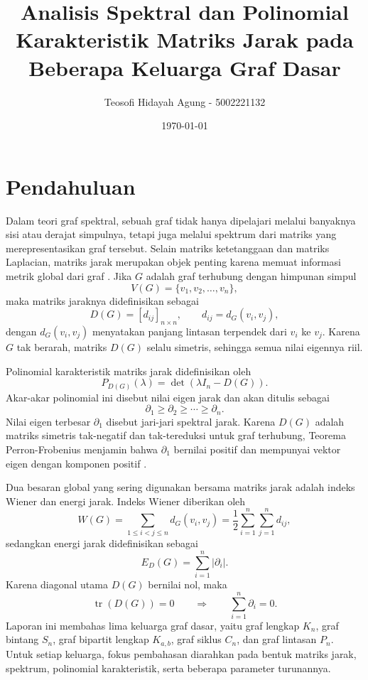 \documentclass[12pt,a4paper]{article}
\title{Analisis Spektral dan Polinomial Karakteristik Matriks Jarak pada Beberapa Keluarga Graf Dasar}
\author{Teosofi Hidayah Agung - 5002221132}
\date{\today}
\begin{document}
\maketitle

\section{Pendahuluan}

Dalam teori graf spektral, sebuah graf tidak hanya dipelajari melalui banyaknya sisi atau derajat simpulnya, tetapi juga melalui spektrum dari matriks yang merepresentasikan graf tersebut. Selain matriks ketetanggaan dan matriks Laplacian, matriks jarak merupakan objek penting karena memuat informasi metrik global dari graf \cite{aouchiche2014distance, stevanovic2012spectral}. Jika $G$ adalah graf terhubung dengan himpunan simpul
\[
  V(G)=\{v_1,v_2,\dots,v_n\},
\]
maka matriks jaraknya didefinisikan sebagai
\[
  D(G)=[d_{ij}]_{n\times n},
  \qquad
  d_{ij}=d_G(v_i,v_j),
\]
dengan $d_G(v_i,v_j)$ menyatakan panjang lintasan terpendek dari $v_i$ ke $v_j$. Karena $G$ tak berarah, matriks $D(G)$ selalu simetris, sehingga semua nilai eigennya riil.

Polinomial karakteristik matriks jarak didefinisikan oleh
\[
  P_{D(G)}(\lambda)=\det(\lambda I_n-D(G)).
\]
Akar-akar polinomial ini disebut nilai eigen jarak dan akan ditulis sebagai
\[
  \partial_1 \ge \partial_2 \ge \cdots \ge \partial_n.
\]
Nilai eigen terbesar $\partial_1$ disebut jari-jari spektral jarak. Karena $D(G)$ adalah matriks simetris tak-negatif dan tak-tereduksi untuk graf terhubung, Teorema Perron-Frobenius menjamin bahwa $\partial_1$ bernilai positif dan mempunyai vektor eigen dengan komponen positif \cite{bapat2010graphs, godsil2001algebraic}.

Dua besaran global yang sering digunakan bersama matriks jarak adalah indeks Wiener dan energi jarak. Indeks Wiener diberikan oleh
\[
  W(G)=\sum_{1\le i<j\le n} d_G(v_i,v_j)
  =\frac12 \sum_{i=1}^n \sum_{j=1}^n d_{ij},
\]
sedangkan energi jarak didefinisikan sebagai
\[
  E_D(G)=\sum_{i=1}^n |\partial_i|.
\]
Karena diagonal utama $D(G)$ bernilai nol, maka
\[
  \operatorname{tr}(D(G))=0
  \qquad\Longrightarrow\qquad
  \sum_{i=1}^n \partial_i=0.
\]
Laporan ini membahas lima keluarga graf dasar, yaitu graf lengkap $K_n$, graf bintang $S_n$, graf bipartit lengkap $K_{a,b}$, graf siklus $C_n$, dan graf lintasan $P_n$. Untuk setiap keluarga, fokus pembahasan diarahkan pada bentuk matriks jarak, spektrum, polinomial karakteristik, serta beberapa parameter turunannya.
\end{document}
